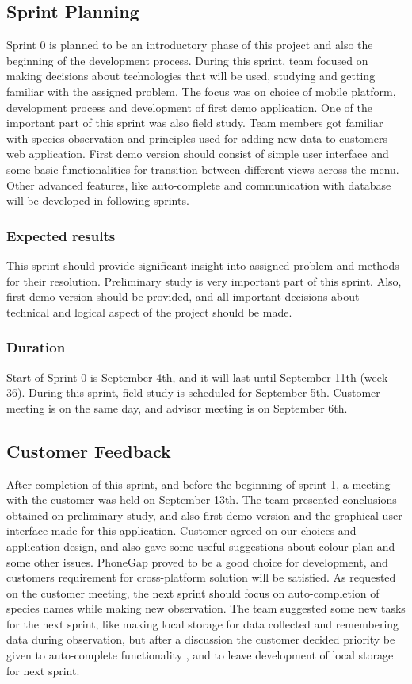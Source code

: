 \subsection{Sprint Planning}
	Sprint 0 is planned to be an introductory phase of this project and also the beginning of the development process. During this sprint, team focused on making decisions about technologies that will be used, studying and getting familiar with the assigned problem. The focus was on choice of mobile platform, development process and development of first demo application. One of the important part of this sprint was also field study. Team members got familiar with species observation and principles used for adding new data to customers web application.\newline
	First demo version should consist of simple user interface and some basic functionalities for transition between different views across the menu. Other advanced features, like auto-complete and communication with database will be developed in following sprints.
	
	\subsubsection{Expected results}
	This sprint should provide significant insight into assigned problem and methods for their resolution. Preliminary study is very important part of this sprint. Also, first demo version should be provided, and all important decisions about technical and logical aspect of the project should be made.
	
	\subsubsection{Duration}
	Start of Sprint 0 is September 4th, and it will last until September 11th (week 36). During this sprint, field study is scheduled for September 5th. Customer meeting is on the same day, and advisor meeting is on September 6th.
	
	
	
\subsection{Customer Feedback}
	After completion of this sprint, and before the beginning of sprint 1, a meeting with the customer was held on September 13th. The team presented conclusions obtained on preliminary study, and also first demo version and the graphical user interface made for this application. Customer agreed on our choices and application design, and also gave some useful suggestions about colour plan and some other issues. PhoneGap proved to be a good choice for development, and customers requirement for cross-platform solution will be satisfied.\newline
	As requested on the customer meeting, the next sprint should focus on auto-completion of species names while making new observation. The team suggested some new tasks for the next sprint, like making local storage for data collected and remembering data during observation, but after a discussion the customer decided priority be given to auto-complete functionality , and to leave development of local storage for next sprint.
	
